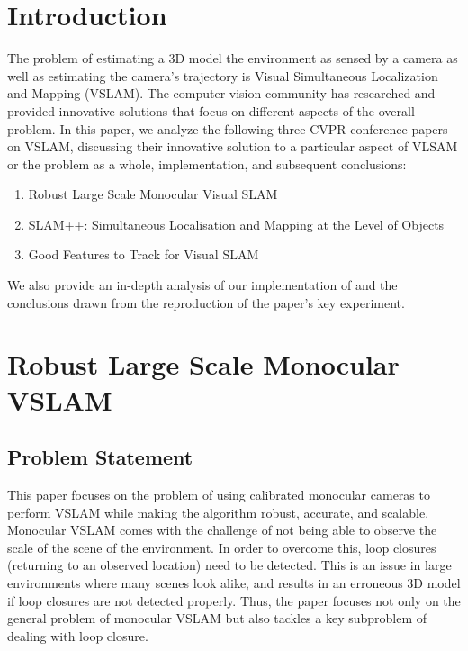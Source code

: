 \documentclass[10pt,twocolumn,letterpaper]{article}
\begin{document}
\section{Introduction}
The problem of estimating a 3D model the environment as sensed by a camera as well as estimating the 
camera's trajectory is Visual Simultaneous Localization and Mapping (VSLAM). The computer vision community has researched 
and provided innovative solutions that focus on different aspects of the overall problem. In this paper, we analyze the following three CVPR conference papers on VSLAM, discussing their innovative solution to a particular aspect of VLSAM or the problem as a whole, implementation, and subsequent conclusions: 
\begin{enumerate}
\item Robust Large Scale Monocular Visual SLAM \cite{Bourmaud_2015_CVPR}
\item SLAM++: Simultaneous Localisation and Mapping at the Level of Objects \cite{Salas-Moreno_2013_CVPR}
\item Good Features to Track for Visual SLAM \cite{Zhang_2015_CVPR} 
\end{enumerate}
We also provide an in-depth analysis of our implementation of \cite{Zhang_2015_CVPR} and the conclusions drawn from the reproduction of the paper's key experiment.

\section{Robust Large Scale Monocular VSLAM}
\subsection{Problem Statement}
This paper focuses on the problem of using calibrated monocular cameras to perform VSLAM 
while making the 
algorithm robust, accurate, and scalable. Monocular VSLAM comes with the challenge of not being able to 
observe the scale of the scene of the environment. In order to overcome this, loop closures (returning to an observed location) need to be
 detected. This is an issue in large environments where many scenes look alike, and results in an erroneous 
3D model if loop closures are not detected properly. Thus, the paper focuses not only on the general 
problem of monocular VSLAM but also tackles 
a key subproblem of dealing with loop closure.
\end{document}
